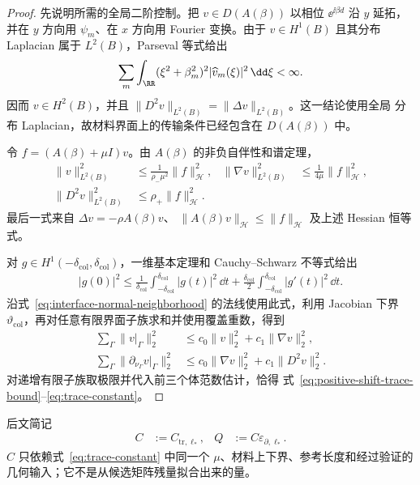 \begin{proof}
  先说明所需的全局二阶控制。把 $v\in D(A(\beta))$ 以相位
  $\ee^{\ii\beta d}$ 沿 $y$ 延拓，并在 $y$ 方向用
  $\psi_m$、在 $x$ 方向用 Fourier 变换。由于 $v\in H^1(B)$ 且其分布 Laplacian 属于
  $L^2(B)$，Parseval 等式给出
  \begin{align*}
    \sum_m\int_{\RR}
    (\xi^2+\beta_m^2)^2|\widehat v_m(\xi)|^2\,\dd\xi<\infty.
  \end{align*}
  因而 $v\in H^2(B)$，并且
  $\lVert D^2v\rVert_{L^2(B)}=\lVert\Delta v\rVert_{L^2(B)}$。这一结论使用全局
  分布 Laplacian，故材料界面上的传输条件已经包含在 $D(A(\beta))$ 中。

  令 $f=(A(\beta)+\mu I)v$。由 $A(\beta)$ 的非负自伴性和谱定理，
  \begin{align*}
    \lVert v\rVert_{L^2(B)}^2
    &\leq\frac{1}{\rho_-\mu^2}\lVert f\rVert_{\mathcal H}^2,
    &\lVert\nabla v\rVert_{L^2(B)}^2
    &\leq\frac{1}{4\mu}\lVert f\rVert_{\mathcal H}^2,\\
    \lVert D^2v\rVert_{L^2(B)}^2
    &\leq\rho_+\lVert f\rVert_{\mathcal H}^2.
  \end{align*}
  最后一式来自 $\Delta v=-\rho A(\beta)v$、
  $\lVert A(\beta)v\rVert_{\mathcal H}\leq\lVert f\rVert_{\mathcal H}$ 及上述 Hessian
  恒等式。

  对 $g\in H^1(-\delta_{\mathrm{col}},\delta_{\mathrm{col}})$，一维基本定理和
  Cauchy--Schwarz 不等式给出
  \begin{align*}
    |g(0)|^2
    \leq\frac{1}{\delta_{\mathrm{col}}}
      \int_{-\delta_{\mathrm{col}}}^{\delta_{\mathrm{col}}}|g(t)|^2\,\dd t
    +\frac{\delta_{\mathrm{col}}}{2}
      \int_{-\delta_{\mathrm{col}}}^{\delta_{\mathrm{col}}}|g'(t)|^2\,\dd t.
  \end{align*}
  沿式~\eqref{eq:interface-normal-neighborhood} 的法线使用此式，利用 Jacobian 下界
  $\vartheta_{\mathrm{col}}$，再对任意有限界面子族求和并使用覆盖重数，得到
  \begin{align*}
    \sum_\Gamma\lVert v|_\Gamma\rVert_2^2
    &\leq c_0\lVert v\rVert_2^2+c_1\lVert\nabla v\rVert_2^2,\\
    \sum_\Gamma\lVert\partial_{\nu_\Gamma}v|_\Gamma\rVert_2^2
    &\leq c_0\lVert\nabla v\rVert_2^2+c_1\lVert D^2v\rVert_2^2.
  \end{align*}
  对递增有限子族取极限并代入前三个体范数估计，恰得
  式~\eqref{eq:positive-shift-trace-bound}--\eqref{eq:trace-constant}。
\end{proof}

后文简记
\begin{align}
  C&:=C_{\mathrm{tr},\ell_*},
  &Q&:=C\varepsilon_{\partial,\ell_*}.
  \label{eq:trace-defect-product}
\end{align}
$C$ 只依赖式~\eqref{eq:trace-constant} 中同一个 $\mu$、材料上下界、参考长度和经过验证的
几何输入；它不是从候选矩阵残量拟合出来的量。


